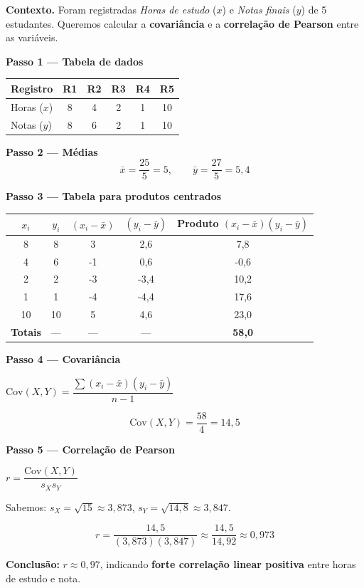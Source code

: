 \begin{SolvedBox}
\textbf{Contexto.} Foram registradas \emph{Horas de estudo} ($x$) e \emph{Notas finais} ($y$) de 5 estudantes. Queremos calcular a \textbf{covariância} e a \textbf{correlação de Pearson} entre as variáveis.

\textbf{Passo 1 — Tabela de dados}\\[-6pt]
\begin{center}
\begin{tabular}{@{}lccccc@{}}\toprule
Registro & R1 & R2 & R3 & R4 & R5 \\\midrule
Horas ($x$) & 8 & 4 & 2 & 1 & 10 \\
Notas ($y$) & 8 & 6 & 2 & 1 & 10 \\\bottomrule
\end{tabular}
\end{center}

\textbf{Passo 2 — Médias}\\
\[
\bar{x} = \frac{25}{5} = 5, 
\qquad 
\bar{y} = \frac{27}{5} = 5{,}4
\]

\textbf{Passo 3 — Tabela para produtos centrados}

\begin{center}
\begin{tabular}{@{}c|c|c|c|c@{}}\toprule
$x_i$ & $y_i$ & $(x_i-\bar{x})$ & $(y_i-\bar{y})$ & Produto $(x_i-\bar{x})(y_i-\bar{y})$ \\\midrule
8  & 8  & 3   & 2,6  & 7,8  \\
4  & 6  & -1  & 0,6  & -0,6 \\
2  & 2  & -3  & -3,4 & 10,2 \\
1  & 1  & -4  & -4,4 & 17,6 \\
10 & 10 & 5   & 4,6  & 23,0 \\\midrule
\textbf{Totais} & --- & --- & --- & \textbf{58,0} \\\bottomrule
\end{tabular}
\end{center}

\textbf{Passo 4 — Covariância}

\begin{FormulaBox}
$\mathrm{Cov}(X,Y) = \dfrac{\sum (x_i-\bar{x})(y_i-\bar{y})}{n-1}$
\end{FormulaBox}

\[
\mathrm{Cov}(X,Y) = \frac{58}{4} = 14,5
\]

\textbf{Passo 5 — Correlação de Pearson}

\begin{FormulaBox}
$r = \dfrac{\mathrm{Cov}(X,Y)}{s_X s_Y}$
\end{FormulaBox}

Sabemos: $s_X=\sqrt{15}\approx 3,873$, \quad $s_Y=\sqrt{14,8}\approx 3,847$.

\[
r = \frac{14,5}{(3,873)(3,847)} \approx \frac{14,5}{14,92} \approx 0,973
\]

\textbf{Conclusão:} $r \approx 0,97$, indicando \textbf{forte correlação linear positiva} entre horas de estudo e nota.
\end{SolvedBox}

